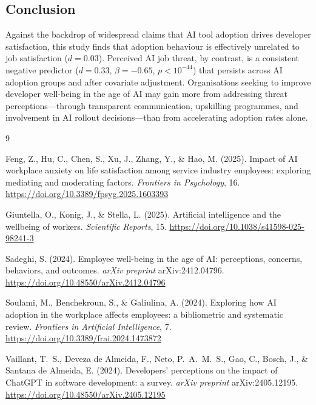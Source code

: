 \documentclass[11pt]{article}
\begin{document}
\subsection{Conclusion}

Against the backdrop of widespread claims that AI tool adoption drives
developer satisfaction, this study finds that adoption behaviour is effectively
unrelated to job satisfaction ($d = 0.03$).
Perceived AI job threat, by contrast, is a consistent negative predictor
($d = 0.33$, $\beta = -0.65$, $p < 10^{-44}$) that persists across AI
adoption groups and after covariate adjustment.
Organisations seeking to improve developer well-being in the age of AI may
gain more from addressing threat perceptions—through transparent communication,
upskilling programmes, and involvement in AI rollout decisions—than from
accelerating adoption rates alone.


\begin{thebibliography}{9}

Feng, Z., Hu, C., Chen, S., Xu, J., Zhang, Y., \& Hao, M. (2025).
Impact of AI workplace anxiety on life satisfaction among service industry
employees: exploring mediating and moderating factors.
\textit{Frontiers in Psychology}, 16.
\url{https://doi.org/10.3389/fpsyg.2025.1603393}

Giuntella, O., Konig, J., \& Stella, L. (2025).
Artificial intelligence and the wellbeing of workers.
\textit{Scientific Reports}, 15.
\url{https://doi.org/10.1038/s41598-025-98241-3}

Sadeghi, S. (2024).
Employee well-being in the age of AI: perceptions, concerns, behaviors,
and outcomes.
\textit{arXiv preprint} arXiv:2412.04796.
\url{https://doi.org/10.48550/arXiv.2412.04796}

Soulami, M., Benchekroun, S., \& Galiulina, A. (2024).
Exploring how AI adoption in the workplace affects employees:
a bibliometric and systematic review.
\textit{Frontiers in Artificial Intelligence}, 7.
\url{https://doi.org/10.3389/frai.2024.1473872}

Vaillant, T.~S., Deveza de Almeida, F., Neto, P.~A.~M.~S., Gao, C.,
Bosch, J., \& Santana de Almeida, E. (2024).
Developers' perceptions on the impact of ChatGPT in software development:
a survey.
\textit{arXiv preprint} arXiv:2405.12195.
\url{https://doi.org/10.48550/arXiv.2405.12195}

\end{thebibliography}
\end{document}
